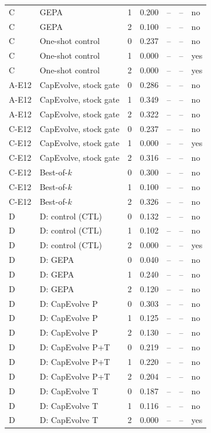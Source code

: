 \begin{table}[t]
\begin{tabular}{@{}llrrrrl@{}}
C & GEPA & 1 & 0.200 & -- & -- & no \\
C & GEPA & 2 & 0.100 & -- & -- & no \\
C & One-shot control & 0 & 0.237 & -- & -- & no \\
C & One-shot control & 1 & 0.000 & -- & -- & yes \\
C & One-shot control & 2 & 0.000 & -- & -- & yes \\
A-E12 & CapEvolve, stock gate & 0 & 0.286 & -- & -- & no \\
A-E12 & CapEvolve, stock gate & 1 & 0.349 & -- & -- & no \\
A-E12 & CapEvolve, stock gate & 2 & 0.322 & -- & -- & no \\
C-E12 & CapEvolve, stock gate & 0 & 0.237 & -- & -- & no \\
C-E12 & CapEvolve, stock gate & 1 & 0.000 & -- & -- & yes \\
C-E12 & CapEvolve, stock gate & 2 & 0.316 & -- & -- & no \\
C-E12 & Best-of-$k$ & 0 & 0.300 & -- & -- & no \\
C-E12 & Best-of-$k$ & 1 & 0.100 & -- & -- & no \\
C-E12 & Best-of-$k$ & 2 & 0.326 & -- & -- & no \\
D & D: control (CTL) & 0 & 0.132 & -- & -- & no \\
D & D: control (CTL) & 1 & 0.102 & -- & -- & no \\
D & D: control (CTL) & 2 & 0.000 & -- & -- & yes \\
D & D: GEPA & 0 & 0.040 & -- & -- & no \\
D & D: GEPA & 1 & 0.240 & -- & -- & no \\
D & D: GEPA & 2 & 0.120 & -- & -- & no \\
D & D: CapEvolve P & 0 & 0.303 & -- & -- & no \\
D & D: CapEvolve P & 1 & 0.125 & -- & -- & no \\
D & D: CapEvolve P & 2 & 0.130 & -- & -- & no \\
D & D: CapEvolve P+T & 0 & 0.219 & -- & -- & no \\
D & D: CapEvolve P+T & 1 & 0.220 & -- & -- & no \\
D & D: CapEvolve P+T & 2 & 0.204 & -- & -- & no \\
D & D: CapEvolve T & 0 & 0.187 & -- & -- & no \\
D & D: CapEvolve T & 1 & 0.116 & -- & -- & no \\
D & D: CapEvolve T & 2 & 0.000 & -- & -- & yes \\

\end{tabular}
\end{table}
